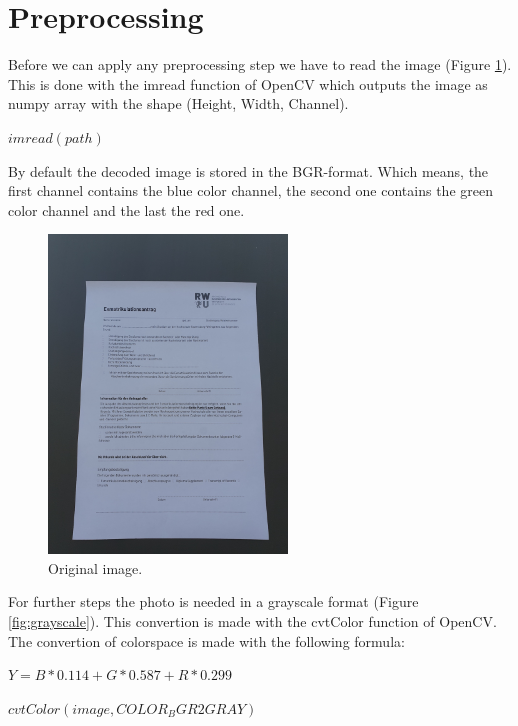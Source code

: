 \documentclass[twocolumn,10pt]{asme2ej}
\begin{document}
\section{Preprocessing}
\label{section:preprocessing}
\noindent
Before we can apply any preprocessing step we have to read the image (Figure \ref{fig:orginial}). This is done with the imread function\cite{opencv_imread} of OpenCV which 
outputs the image as numpy array with the shape (Height, Width, Channel).
\begin{center}
    \noindent
    $imread(path)$
\end{center}
\noindent
By default the decoded image is stored in the BGR-format. Which means, the first channel contains the
blue color channel, the second one contains the green color channel and the last the red one.
\begin{figure}[H]
    \centerline{\includegraphics[width=2.5in]{output/hoch_3_1_original.jpg}}
    \caption{Original image.}
    \label{fig:orginial}
\end{figure}
\noindent
For further steps the photo is needed in a grayscale format (Figure \ref{fig:grayscale}).
This convertion is made with the cvtColor\cite{opencv_cvtColor} function of OpenCV. The convertion of colorspace is made with the following
formula\cite{opencv_rgb2gray}:
\begin{center}
    $Y = B * 0.114 + G * 0.587 + R * 0.299$
    \label{eq_rgb2gray}
\end{center}
\begin{center}
    \noindent
    $cvtColor(image,COLOR_BGR2GRAY)$
\end{center}
\end{document}
